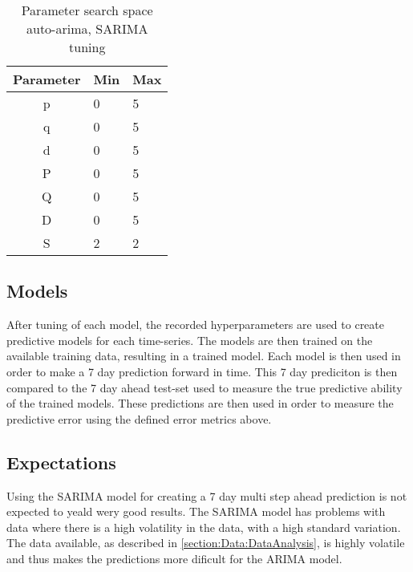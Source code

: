 \begin{table}[h]
  \centering
  \caption{Parameter search space auto-arima, SARIMA tuning}
  \label{table:method:arima-tuning}
  \begin{tabular}{|c|l|l|}\hline
    Parameter & Min & Max \\ \hline
    p         & 0   & 5   \\ \hline
    q         & 0   & 5   \\ \hline
    d         & 0   & 5   \\ \hline
    P         & 0   & 5   \\ \hline
    Q         & 0   & 5   \\ \hline
    D         & 0   & 5   \\ \hline
    S         & 2   & 2   \\ \hline
  \end{tabular}
\end{table}


\subsection{Models}

After tuning of each model, the recorded hyperparameters are used to create predictive models for each time-series.
The models are then trained on the available training data, resulting in a trained model.
Each model is then used in order to make a 7 day prediction forward in time.
This 7 day prediciton is then compared to the 7 day ahead test-set used to measure the true predictive ability of the trained models.
These predictions are then used in order to measure the predictive error using the defined error metrics above.


\subsection{Expectations}

Using the SARIMA model for creating a 7 day multi step ahead prediction is not expected to yeald wery good results.
The SARIMA model has problems with data where there is a high volatility in the data, with a high standard variation.
The data available, as described in \cref{section:Data:DataAnalysis},
is highly volatile and thus makes the predictions more dificult for the ARIMA model.




